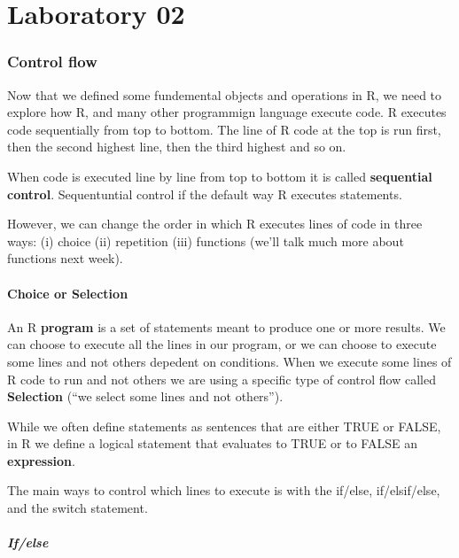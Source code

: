 
\chapter{Laboratory 02}

\hspace{1mm}
\hypertarget{control-flow}{%
\subsection{Control flow}\label{control-flow}}

Now that we defined some fundemental objects and operations in R, we
need to explore how R, and many other programmign language execute code.
R executes code sequentially from top to bottom. The line of R code at
the top is run first, then the second highest line, then the third
highest and so on.

When code is executed line by line from top to bottom it is called
\textbf{sequential control}. Sequentuntial control if the default way R
executes statements.

However, we can change the order in which R executes lines of code in
three ways: (i) choice (ii) repetition (iii) functions (we'll talk much
more about functions next week).

    \hypertarget{choice-or-selection}{%
\subsubsection{Choice or Selection}\label{choice-or-selection}}

An R \textbf{program} is a set of statements meant to produce one or
more results. We can choose to execute all the lines in our program, or
we can choose to execute some lines and not others depedent on
conditions. When we execute some lines of R code to run and not others
we are using a specific type of control flow called \textbf{Selection}
(``we select some lines and not others'').

While we often define statements as sentences that are either TRUE or
FALSE, in R we define a logical statement that evaluates to TRUE or to
FALSE an \textbf{expression}.

The main ways to control which lines to execute is with the if/else,
if/elsif/else, and the switch statement.

\hypertarget{ifelse}{%
\paragraph{If/else}\label{ifelse}}

